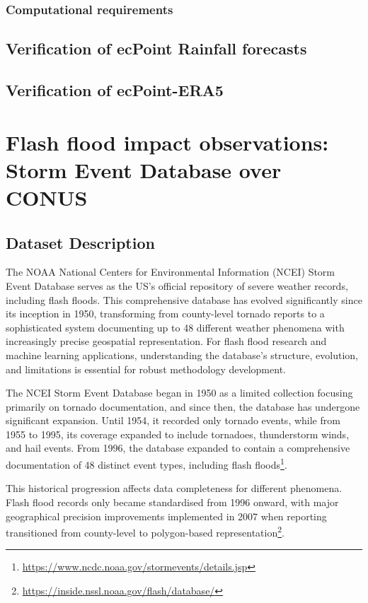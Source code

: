 \subsubsection{Computational requirements}


\subsection{Verification of ecPoint Rainfall forecasts}


\subsection{Verification of ecPoint-ERA5}



\section{Flash flood impact observations: Storm Event Database over CONUS}

\subsection{Dataset Description}

The NOAA National Centers for Environmental Information (NCEI) Storm Event Database serves as the US's official repository of severe weather records, including flash floods. This comprehensive database has evolved significantly since its inception in 1950, transforming from county-level tornado reports to a sophisticated system documenting up to 48 different weather phenomena with increasingly precise geospatial representation. For flash flood research and machine learning applications, understanding the database's structure, evolution, and limitations is essential for robust methodology development. 

The NCEI Storm Event Database began in 1950 as a limited collection focusing primarily on tornado documentation, and since then, the database has undergone significant expansion. Until 1954, it recorded only tornado events, while from 1955 to 1995, its coverage expanded to include tornadoes, thunderstorm winds, and hail events. From 1996, the database expanded to contain a comprehensive documentation of 48 distinct event types, including flash floods\footnote{\url{https://www.ncdc.noaa.gov/stormevents/details.jsp}}. 

This historical progression affects data completeness for different phenomena. Flash flood records only became standardised from 1996 onward, with major geographical precision improvements implemented in 2007 when reporting transitioned from county-level to polygon-based representation\footnote{\url{https://inside.nssl.noaa.gov/flash/database/}}.


